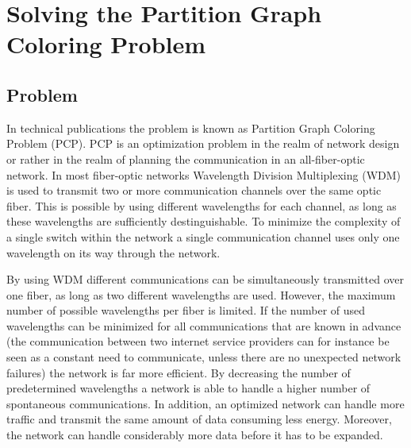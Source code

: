 \documentclass[paper = a4, fontsize = 10pt]{scrartcl}
\begin{document}
\section{Solving the Partition Graph Coloring Problem}

\subsection{Problem}
In technical publications the problem is known as Partition Graph Coloring Problem (PCP). PCP is an optimization problem in the realm of network design or rather in the realm of planning the communication in an all-fiber-optic network. In most fiber-optic networks Wavelength Division Multiplexing (WDM) is used to transmit two or more communication channels over the same optic fiber. This is possible by using different wavelengths for each channel, as long as these wavelengths are sufficiently destinguishable. To minimize the complexity of a single switch within the network a single communication channel uses only one wavelength on its way through the network.


By using WDM different communications can be simultaneously transmitted over one fiber, as long as two different wavelengths are used. However, the maximum number of possible wavelengths per fiber is limited. If the number of used wavelengths can be minimized for all communications that are known in advance (the communication between two internet service providers can for instance be seen as a constant need to communicate, unless there are no unexpected network failures) the network is far more efficient. By decreasing the number of predetermined wavelengths a network is able to handle a higher number of spontaneous communications. In addition, an optimized network can handle more traffic and transmit the same amount of data consuming less energy. Moreover, the network can handle considerably more data before it has to be expanded.
\end{document}
